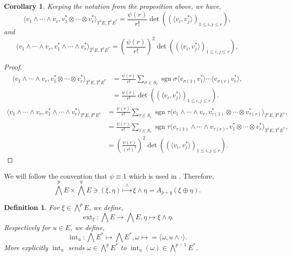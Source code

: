 \documentclass[8pt]{article}
\newtheorem{definition}{Definition}[section]
\newtheorem{corollary}{Corollary} [section]
\DeclareMathOperator{\sgn}{sgn}
\DeclareMathOperator{\ext}{ext}
\DeclareMathOperator{\inte}{int}
\begin{document}
\begin{corollary}
  Keeping the notation from the proposition above, we have,
  \begin{equation*}
    \langle v_1\wedge\cdots\wedge v_r,v_1^*\otimes \cdots\otimes v_r^*\rangle_{T^rE,T^rE^*} = {\frac {\psi(r)} {r!}}\det((\langle v_i,v_j^*\rangle)_{1\leq i,j\leq r}),
  \end{equation*}
  and 
  \begin{equation*}
    \langle v_1\wedge\cdots\wedge v_r,v_1^*\wedge \cdots\wedge v_r^*\rangle_{T^rE,T^rE^*} = \left({\frac {\psi(r)} {r!}}\right)^2\det((\langle v_i,v_j^*\rangle)_{1\leq i,j\leq r}),
  \end{equation*}
\end{corollary}
\begin{proof}
  \begin{align*}
    \langle v_1\wedge\cdots\wedge v_r,v_1^*\otimes \cdots\otimes v_r^*\rangle_{T^rE,T^rE^*} & = {\frac {\psi(r)} {r!}}\sum_{\sigma\in S_r}\sgn\sigma \langle v_{\sigma(1)}v^*_1\rangle\cdots\langle v_{\sigma(r)}v^*_r\rangle,\\
    & = {\frac {\psi(r)} {r!}}\det((\langle v_i,v_j^*\rangle)_{1\leq i,j\leq r}).
  \end{align*}
  \begin{align*}
    \langle v_1\wedge\cdots\wedge v_r,v_1^*\wedge \cdots\wedge v_r^*\rangle_{T^rE,T^rE^*} 
    & = {\frac {\psi(r)} {r!}}\sum_{\tau\in S_r}\sgn\tau\langle v_1\wedge\cdots\wedge v_r,v_{\tau(1)}^*\otimes \cdots\otimes v_{\tau(r)}^*\rangle_{T^rE,T^rE^*},\\
    &  = {\frac {\psi(r)} {r!}}\sum_{\tau\in S_r}\sgn\tau \langle v_{\tau(1)}\wedge\cdots\wedge v_{\tau(r)},v_1^*\otimes \cdots\otimes v_r^*\rangle_{T^rE,T^rE^*},\\
    & = \left({\frac {\psi(r)} {(r!)^2}}\right)^2\det((\langle v_i,v_j^*\rangle)_{1\leq i,j\leq r}).
  \end{align*}
\end{proof}

We will follow the convention that $\psi\equiv 1$ which is used in \cite{Kobayashi-Nomizu}. Therefore,
\begin{equation*}
  \bigwedge^p E\times\bigwedge^qE\ni(\xi,\eta)\stackrel{\cdot\wedge\cdot}{\mapsto} \xi\wedge\eta = A_{p+q}(\xi\oplus\eta).
\end{equation*}

\begin{definition}
  For $\xi\in\bigwedge^pE$, we define,
  \begin{equation*}
    \ext_\xi:\bigwedge E \to\bigwedge E, \eta\mapsto \xi\wedge\eta.
  \end{equation*}
  Respectively for $u\in E$, we define,
  \begin{equation*}
  \inte_u:\bigwedge E^*\mapsto \bigwedge E^*, \omega\mapsto  = \langle \omega,u\wedge \cdot\rangle.%
  \end{equation*}
  More explicitly $\inte_u$ sends $\omega\in \bigwedge^pE^*$ to $\inte_u(\omega)\in\bigwedge^{p-1}E^*$.
\end{definition}
\end{document}
